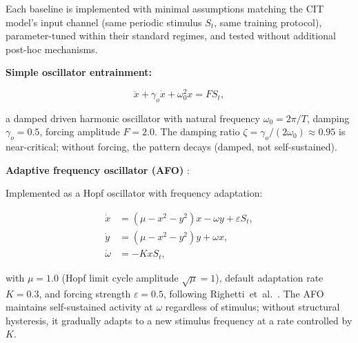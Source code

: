 \documentclass[12pt,a4paper]{article}
\begin{document}
Each baseline is implemented with minimal assumptions matching the CIT model's input channel (same periodic stimulus $S_t$, same training protocol), parameter-tuned within their standard regimes, and tested without additional post-hoc mechanisms.



\textbf{Simple oscillator entrainment:}

\begin{equation}

\ddot{x} + \gamma_o \dot{x} + \omega_0^2 x = F S_t,

\end{equation}

a damped driven harmonic oscillator with natural frequency $\omega_0 = 2\pi/T$, damping $\gamma_o = 0.5$, forcing amplitude $F = 2.0$. The damping ratio $\zeta = \gamma_o/(2\omega_0) \approx 0.95$ is near-critical; without forcing, the pattern decays (damped, not self-sustained).



\textbf{Adaptive frequency oscillator (AFO)} \cite{righetti2009adaptive, buchli2006adaptive}:

Implemented as a Hopf oscillator with frequency adaptation:

\begin{align}

\dot{x} &= (\mu - x^2 - y^2)x - \omega y + \varepsilon S_t, 

\nonumber \\

\dot{y} &= (\mu - x^2 - y^2)y + \omega x, 

\nonumber \\

\dot{\omega} &= -K x S_t, \label{eq:afo}

\end{align}

with $\mu=1.0$ (Hopf limit cycle amplitude $\sqrt{\mu}=1$), default adaptation rate $K=0.3$, and forcing strength $\varepsilon=0.5$, following Righetti~et~al.~\cite{righetti2009adaptive}. The AFO maintains self-sustained activity at $\omega$ regardless of stimulus; without structural hysteresis, it gradually adapts to a new stimulus frequency at a rate controlled by $K$.
\end{document}
